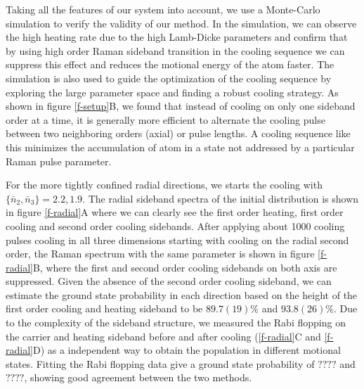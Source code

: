 \documentclass[aps,prl,twocolumn,groupedaddress]{revtex4-1}
\begin{document}
Taking all the features of our system into account, we use a Monte-Carlo simulation to verify
the validity of our method.
In the simulation, we can observe the high heating rate due to the high Lamb-Dicke parameters
and confirm that by using high order Raman sideband transition in the cooling sequence we can
suppress this effect and reduces the motional energy of the atom faster.
The simulation is also used to guide the optimization of the cooling sequence by exploring the
large parameter space and finding a robust cooling strategy. As shown in figure \ref{f-setup}B,
we found that instead of cooling on only one sideband order at a time, it is generally more
efficient to alternate the cooling pulse between two neighboring orders (axial) or pulse lengths.
A cooling sequence like this minimizes the accumulation of atom in a state not addressed by a
particular Raman pulse parameter.

For the more tightly confined radial directions,
we starts the cooling with $\{\bar n_2, \bar n_3\}=2.2, 1.9$.
The radial sideband spectra of the initial distribution is shown in figure \ref{f-radial}A
where we can clearly see the first order heating, first order cooling and
second order cooling sidebands.
After applying about 1000 cooling pulses cooling in all three dimensions
starting with cooling on the radial second order,
the Raman spectrum with the same parameter is shown in figure \ref{f-radial}B,
where the first and second order cooling sidebands on both axis are suppressed.
Given the absence of the second order cooling sideband,
we can estimate the ground state probability in each direction based on the height of
the first order cooling and heating sideband to be $89.7(19)\%$ and $93.8(26)\%$.
Due to the complexity of the sideband structure,
we measured the Rabi flopping on the carrier and heating sideband before and after cooling
(\ref{f-radial}C and \ref{f-radial}D)
as a independent way to obtain the population in different motional states.
Fitting the Rabi flopping data give a ground state probability of $????$ and $????$,
showing good agreement between the two methods.
\end{document}
